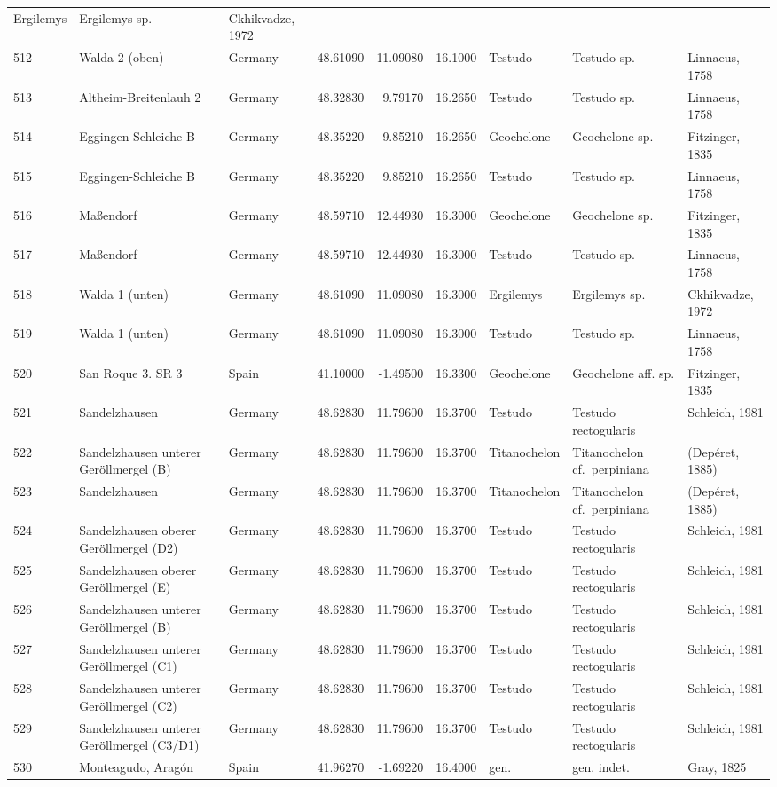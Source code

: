 \documentclass[]{article}
\begin{document}
\begin{longtable}[]{@{}lllrrrlll@{}}
Ergilemys & Ergilemys sp. & Ckhikvadze, 1972\tabularnewline
512 & Walda 2 (oben) & Germany & 48.61090 & 11.09080 & 16.1000 & Testudo
& Testudo sp. & Linnaeus, 1758\tabularnewline
513 & Altheim-Breitenlauh 2 & Germany & 48.32830 & 9.79170 & 16.2650 &
Testudo & Testudo sp. & Linnaeus, 1758\tabularnewline
514 & Eggingen-Schleiche B & Germany & 48.35220 & 9.85210 & 16.2650 &
Geochelone & Geochelone sp. & Fitzinger, 1835\tabularnewline
515 & Eggingen-Schleiche B & Germany & 48.35220 & 9.85210 & 16.2650 &
Testudo & Testudo sp. & Linnaeus, 1758\tabularnewline
516 & Maßendorf & Germany & 48.59710 & 12.44930 & 16.3000 & Geochelone &
Geochelone sp. & Fitzinger, 1835\tabularnewline
517 & Maßendorf & Germany & 48.59710 & 12.44930 & 16.3000 & Testudo &
Testudo sp. & Linnaeus, 1758\tabularnewline
518 & Walda 1 (unten) & Germany & 48.61090 & 11.09080 & 16.3000 &
Ergilemys & Ergilemys sp. & Ckhikvadze, 1972\tabularnewline
519 & Walda 1 (unten) & Germany & 48.61090 & 11.09080 & 16.3000 &
Testudo & Testudo sp. & Linnaeus, 1758\tabularnewline
520 & San Roque 3. SR 3 & Spain & 41.10000 & -1.49500 & 16.3300 &
Geochelone & Geochelone aff. sp. & Fitzinger, 1835\tabularnewline
521 & Sandelzhausen & Germany & 48.62830 & 11.79600 & 16.3700 & Testudo
& Testudo rectogularis & Schleich, 1981\tabularnewline
522 & Sandelzhausen unterer Geröllmergel (B) & Germany & 48.62830 &
11.79600 & 16.3700 & Titanochelon & Titanochelon cf.~perpiniana &
(Depéret, 1885)\tabularnewline
523 & Sandelzhausen & Germany & 48.62830 & 11.79600 & 16.3700 &
Titanochelon & Titanochelon cf.~perpiniana & (Depéret,
1885)\tabularnewline
524 & Sandelzhausen oberer Geröllmergel (D2) & Germany & 48.62830 &
11.79600 & 16.3700 & Testudo & Testudo rectogularis & Schleich,
1981\tabularnewline
525 & Sandelzhausen oberer Geröllmergel (E) & Germany & 48.62830 &
11.79600 & 16.3700 & Testudo & Testudo rectogularis & Schleich,
1981\tabularnewline
526 & Sandelzhausen unterer Geröllmergel (B) & Germany & 48.62830 &
11.79600 & 16.3700 & Testudo & Testudo rectogularis & Schleich,
1981\tabularnewline
527 & Sandelzhausen unterer Geröllmergel (C1) & Germany & 48.62830 &
11.79600 & 16.3700 & Testudo & Testudo rectogularis & Schleich,
1981\tabularnewline
528 & Sandelzhausen unterer Geröllmergel (C2) & Germany & 48.62830 &
11.79600 & 16.3700 & Testudo & Testudo rectogularis & Schleich,
1981\tabularnewline
529 & Sandelzhausen unterer Geröllmergel (C3/D1) & Germany & 48.62830 &
11.79600 & 16.3700 & Testudo & Testudo rectogularis & Schleich,
1981\tabularnewline
530 & Monteagudo, Aragón & Spain & 41.96270 & -1.69220 & 16.4000 & gen.
& gen. indet. & Gray, 1825\tabularnewline

\end{longtable}
\end{document}
